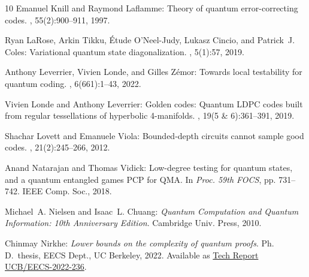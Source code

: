 \documentclass[11pt]{article}
\begin{document}
\begin{thebibliography}{10}
{\sc Emanuel Knill and Raymond Laflamme}: Theory of quantum error-correcting
  codes.
, 55(2):900--911, 1997.

{\sc Ryan LaRose, Arkin Tikku, {\'E}tude O'Neel-Judy, Lukasz Cincio, and
  Patrick~J. Coles}: Variational quantum state diagonalization.
, 5(1):57, 2019.
\newblock [\epfmtdoi{10.1038/s41534-019-0167-6}]

{\sc Anthony Leverrier, Vivien Londe, and Gilles Z{\'{e}}mor}: Towards local
  testability for quantum coding.
, 6(661):1--43, 2022.

{\sc Vivien Londe and Anthony Leverrier}: Golden codes: Quantum {LDPC} codes
  built from regular tessellations of hyperbolic 4-manifolds.
, 19(5 \& 6):361--391, 2019.

{\sc Shachar Lovett and Emanuele Viola}: Bounded-depth circuits cannot sample
  good codes.
, 21(2):245--266, 2012.

{\sc Anand Natarajan and Thomas Vidick}: Low-degree testing for quantum states,
  and a quantum entangled games {PCP} for {QMA}.
\newblock In {\em Proc. 59th FOCS}, pp. 731--742. IEEE Comp. Soc., 2018.

{\sc Michael~A. Nielsen and Isaac~L. Chuang}: {\em Quantum Computation and
  Quantum Information: 10th Anniversary Edition}.
\newblock Cambridge Univ. Press, 2010.

{\sc Chinmay Nirkhe}: {\em Lower bounds on the complexity of quantum proofs}.
\newblock Ph.\,D.\ thesis, EECS Dept., UC Berkeley, 2022.
\newblock Available as
  \href{http://www2.eecs.berkeley.edu/Pubs/TechRpts/2022/EECS-2022-236.html}{Tech
  Report UCB/EECS-2022-236}.


\end{thebibliography}
\end{document}
